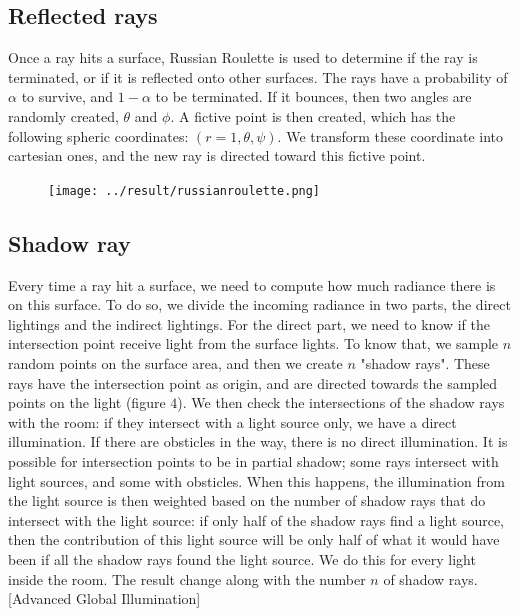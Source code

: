 \documentclass[12pt]{article}
\numberwithin{equation}{section}
\begin{document}
\subsection{Reflected rays}
Once a ray hits a surface, Russian Roulette is used to determine if the ray is terminated, or if it is reflected onto other surfaces. The rays have a probability of $\alpha$ to survive, and $1-\alpha$ to be terminated. If it bounces, then two angles are randomly created, $\theta$ and $\phi$. A fictive point is then created, which has the following spheric coordinates: $(r=1, \theta, \psi)$. We transform these coordinate into cartesian ones, and the new ray is directed toward this fictive point.

\begin{figure}
  \begin{center}
    \texttt{[image: ../result/russianroulette.png]}
    \caption{}
    \label{fig:1}
  \end{center}
\end{figure}

\subsection{Shadow ray}

Every time a ray hit a surface, we need to compute how much radiance there is on this surface. To do so, we divide the incoming radiance in two parts, the direct lightings and the indirect lightings. For the direct part, we need to know if the intersection point receive light from the surface lights. To know that, we sample $n$ random points on the surface area, and then we create $n$ "shadow rays". These rays have the intersection point as origin, and are directed towards the sampled points on the light (figure $4$). We then check the intersections of the shadow rays with the room: if they intersect with a light source only, we have a direct illumination. If there are obsticles in the way, there is no direct illumination. It is possible for intersection points to be in partial shadow; some rays intersect with light sources, and some with obsticles. When this happens, the illumination from the light source is then weighted based on the number of shadow rays that do intersect with the light source: if only half of the shadow rays find a light source, then the contribution of this light source will be only half of what it would have been if all the shadow rays found the light source. We do this for every light inside the room. The result change along with the number $n$ of shadow rays. [Advanced Global Illumination]
\end{document}
